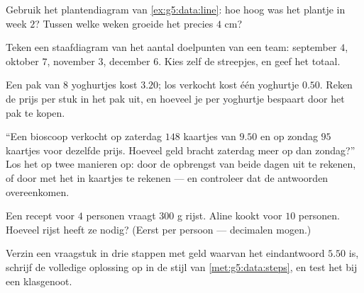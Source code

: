 \begin{exercise}[$\star$]\label{exo:g5:data:6}
Gebruik het plantendiagram van \cref{ex:g5:data:line}: hoe hoog was het
plantje in week $2$? Tussen welke weken groeide het precies $4$ cm?
\end{exercise}

\begin{exercise}[$\star$]\label{exo:g5:data:7}
Teken een staafdiagram van het aantal doelpunten van een team: september $4$,
oktober $7$, november $3$, december $6$. Kies zelf de streepjes, en geef het
totaal.
\end{exercise}

\begin{exercise}[$\star$]\label{exo:g5:data:8}
Een pak van $8$ yoghurtjes kost $3.20$; los verkocht kost één yoghurtje
$0.50$. Reken de prijs per stuk in het pak uit, en hoeveel je per yoghurtje
bespaart door het pak te kopen.
\end{exercise}

\begin{exercise}[$\star\star$]\label{exo:g5:data:9}
``Een bioscoop verkocht op zaterdag $148$ kaartjes van $9.50$ en op zondag
$95$ kaartjes voor dezelfde prijs. Hoeveel geld bracht zaterdag meer op dan
zondag?'' Los het op twee manieren op: door de opbrengst van beide dagen uit
te rekenen, of door met het \emph{} in kaartjes te rekenen --- en
controleer dat de antwoorden overeenkomen.
\end{exercise}

\begin{exercise}[$\star\star$]\label{exo:g5:data:10}
Een recept voor $4$ personen vraagt $300$ g rijst. Aline kookt voor $10$
personen. Hoeveel rijst heeft ze nodig? (Eerst per persoon --- decimalen
mogen.)
\end{exercise}

\begin{exercise}[$\star\star$]\label{exo:g5:data:11}
Verzin een vraagstuk in drie stappen met geld waarvan het eindantwoord $5.50$
is, schrijf de volledige oplossing op in de stijl van
\cref{met:g5:data:steps}, en test het bij een klasgenoot.
\end{exercise}
